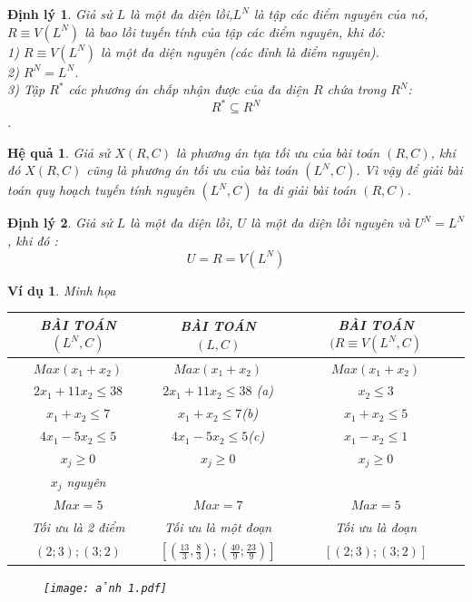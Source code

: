 \documentclass[12pt,a4paper]{report}
\newtheorem{dl}{Định lý}
\newtheorem{hq}{Hệ quả}
\newtheorem{vd}{Ví dụ}
\begin{document}
\begin{dl}
   Giả sử $L$ là một đa diện lồi,$L^N$ là tập các điểm nguyên của nó, 
$R\equiv V(L^N)$ là bao lồi tuyến tính của tập các điểm nguyên, khi đó:\\

     1) $R\equiv V(L^N)$ là một đa diện nguyên (các đỉnh là điểm nguyên).\\
     2) $R^N=L^N$.\\
    3) Tập $R^\ast$ các phương án chấp nhận được của đa diện $R$ chứa trong $R^N$:\\
    $$R^{\ast} \subseteq R^N$$.\\
\end{dl}
\begin{hq}
     Giả sử $X(R,C)$  là phương án tựa tối ưu của bài toán  $(R,C)$, khi đó
$X(R,C)$ cũng là phương án tối ưu của bài toán  $(L^N,C)$. Vì vậy để giải bài toán quy hoạch tuyến tính nguyên $(L^N,C)$ ta đi giải bài toán $(R,C)$.\\
\end{hq}
\begin{dl}
 Giả sử $L$ là một đa diện lồi, $U$ là một đa diện lồi nguyên và $U^N= L^N$, khi đó :
 $$U = R = V(L^N)$$
    \end{dl}
\begin{vd}Minh họa\\
\begin{tabular}{|c|c|c|}
    \hline
     BÀI TOÁN $(L^N,C)$  & BÀI TOÁN $(L,C)$& BÀI TOÁN $(R\equiv V(L^N,C)$  \\
     \hline
       $Max (x_1
+x_2)$  & $Max (x_1+x_2) $ &$Max (x_1+x_2)$ \\
$2x_1+11x_2\le 38$ & $2x_1+11x_2 \le 38$  \quad (a) & $x_2\le 3$\\
$x_1+x_2\le 7$ &$x_1+x_2\le 7$\quad (b) & $x_1+x_2\le 5$\\
$4x_1-5x_2\le 5$ & $4x_1-5x_2\le 5$\quad (c) & $x_1-x_2\le 1$\\
$x_j\ge 0$ & $x_j\ge 0$ & $x_j\ge 0$\\
$x_j$ nguyên & &\\
\hline 
$Max= 5$& $Max=7$ &$Max=5$\\
Tối ưu là 2 điểm & Tối ưu là một đoạn & Tối ưu là đoạn\\
$(2;3);(3;2)$&$[(\frac{13}{3},\frac{8}{3}); (\frac{40}{9};\frac{23}{9})]$&$[(2;3);(3;2)]$\\
\hline
    \end{tabular}
\begin{figure}[h]
\centering
\texttt{[image: ảnh 1.pdf]}
\end{figure}    
\end{vd}
\end{document}
